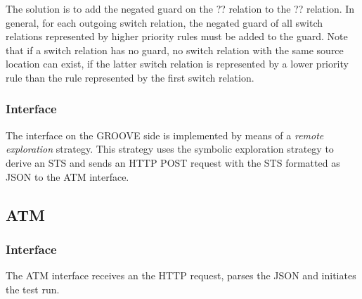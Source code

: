 The solution is to add the negated guard on the ?? relation to the ?? relation. In general, for each outgoing switch relation, the negated guard of all switch relations represented by higher priority rules must be added to the guard. Note that if a switch relation has no guard, no switch relation with the same source location can exist, if the latter switch relation is represented by a lower priority rule than the rule represented by the first switch relation.

\subsubsection{Interface}
The interface on the GROOVE side is implemented by means of a \textit{remote exploration} strategy. This strategy uses the symbolic exploration strategy to derive an STS and sends an HTTP POST request with the STS formatted as JSON to the ATM interface.

\subsection{ATM}

\subsubsection{Interface}
The ATM interface receives an the HTTP request, parses the JSON and initiates the test run.


